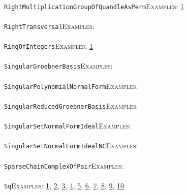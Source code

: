 \documentclass[a4paper,11pt]{report}
\begin{document}
{{ \\
 \texttt{RightMultiplicationGroupOfQuandleAsPerm}{\nobreakspace}{\nobreakspace}{\nobreakspace}{\nobreakspace}\textsc{Examples:} \href{../www/SideLinks/About/aboutQuandles.html} {1}{\nobreakspace} \\
 \\
 \texttt{RightTransversal}{\nobreakspace}{\nobreakspace}{\nobreakspace}{\nobreakspace}\textsc{Examples:} \\
 \\
 \texttt{RingOfIntegers}{\nobreakspace}{\nobreakspace}{\nobreakspace}{\nobreakspace}\textsc{Examples:} \href{tutorial/chap10.html} {1}{\nobreakspace} \\
 \\
 \texttt{SingularGroebnerBasis}{\nobreakspace}{\nobreakspace}{\nobreakspace}{\nobreakspace}\textsc{Examples:} \\
 \\
 \texttt{SingularPolynomialNormalForm}{\nobreakspace}{\nobreakspace}{\nobreakspace}{\nobreakspace}\textsc{Examples:} \\
 \\
 \texttt{SingularReducedGroebnerBasis}{\nobreakspace}{\nobreakspace}{\nobreakspace}{\nobreakspace}\textsc{Examples:} \\
 \\
 \texttt{SingularSetNormalFormIdeal}{\nobreakspace}{\nobreakspace}{\nobreakspace}{\nobreakspace}\textsc{Examples:} \\
 \\
 \texttt{SingularSetNormalFormIdealNC}{\nobreakspace}{\nobreakspace}{\nobreakspace}{\nobreakspace}\textsc{Examples:} \\
 \\
 \texttt{SparseChainComplexOfPair}{\nobreakspace}{\nobreakspace}{\nobreakspace}{\nobreakspace}\textsc{Examples:} \\
 \\
 \texttt{Sq}{\nobreakspace}{\nobreakspace}{\nobreakspace}{\nobreakspace}\textsc{Examples:} \href{tutorial/chap7.html} {1}{\nobreakspace}, \href{tutorial/chap10.html} {2}{\nobreakspace}, \href{../www/SideLinks/About/aboutArtinGroups.html} {3}{\nobreakspace}, \href{../www/SideLinks/About/aboutModPRings.html} {4}{\nobreakspace}, \href{../www/SideLinks/About/aboutAspherical.html} {5}{\nobreakspace}, \href{../www/SideLinks/About/aboutNonabelian.html} {6}{\nobreakspace}, \href{../www/SideLinks/About/aboutQuandles2.html} {7}{\nobreakspace}, \href{../www/SideLinks/About/aboutKnots.html} {8}{\nobreakspace}, \href{../www/SideLinks/About/aboutTensorSquare.html} {9}{\nobreakspace}, \href{../www/SideLinks/About/aboutKnotsQuandles.html} {10}{\nobreakspace} \\
}}
\end{document}
